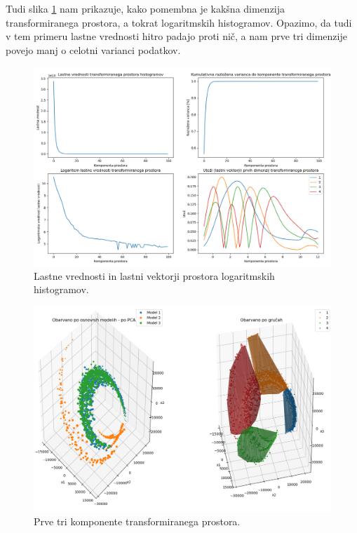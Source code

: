 \documentclass[a4paper]{IEEEtran}
\begin{document}
Tudi slika \ref{fig:logeig} nam prikazuje, kako pomembna je kakšna dimenzija transformiranega prostora, a tokrat logaritmskih histogramov. Opazimo, da tudi v tem primeru lastne vrednosti hitro padajo proti nič, a nam prve tri dimenzije povejo manj o celotni varianci podatkov.

\begin{figure}
	\centering
	\includegraphics[width=0.9\linewidth]{Figures/log_eigendecomp}
	\caption{Lastne vrednosti in lastni vektorji prostora logaritmskih histogramov.}
	\label{fig:logeig}
\end{figure}

\begin{figure}
	\centering
	\includegraphics[width=0.8\linewidth]{Figures/log4pca}
	\caption{Prve tri komponente transformiranega prostora.}
	\label{fig:log4pca}
\end{figure}
\end{document}
